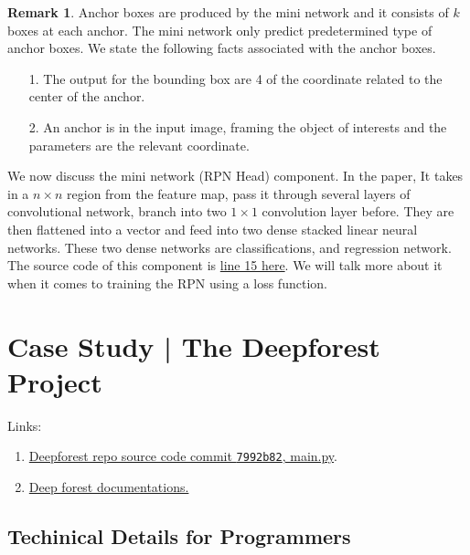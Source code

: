 \documentclass[]{article}
\theoremstyle{definition}
\newtheorem{remark}{Remark}[subsection]
{
    \newtheorem{assumption}{Assumption}
}
\numberwithin{equation}{subsection}
\newcommand{\inlinecode}[1]{\texttt{\footnotesize #1}}
\begin{document}
            \begin{remark}
                Anchor boxes are produced by the mini network and it consists of $k$ boxes at each anchor. 
                The mini network only predict predetermined type of anchor boxes.
                We state the following facts associated with the anchor boxes.  
                \begin{enumerate}
                    \item [1.] The output for the bounding box are 4 of the coordinate related to the center of the anchor. 
                    \item [2.] An anchor is in the input image, framing the object of interests and the parameters are the relevant coordinate. 
                \end{enumerate}
            \end{remark}
            \par
            We now discuss the mini network (RPN Head) component. 
            In the paper, It takes in a $n\times n$ region from the feature map, pass it through several layers of convolutional network, branch into two $1\times 1$ convolution layer before. 
            They are then flattened into a vector and feed into two dense stacked linear neural networks. These two dense networks are classifications, and regression network. 
            The source code of this component is \href{https://github.com/pytorch/vision/blob/5181a854d8b127cf465cd22a67c1b5aaf6ccae05/torchvision/models/detection/rpn.py#L15}{line 15 here}. 
            We will talk more about it when it comes to training the RPN using a loss function. 
            
\section{Case Study | The Deepforest Project}
    Links: 
    \begin{enumerate}
        \item \href{https://github.com/weecology/DeepForest/blob/6b1c199ce65f95dc74c9e79d1e2c686e784910b2/deepforest/main.py}{Deepforest repo source code commit \inlinecode{7992b82}, main.py}. 
        \item \href{https://deepforest.readthedocs.io/en/latest/getting_started.html}{Deep forest documentations. }
    \end{enumerate}
    \subsection{Techinical Details for Programmers}
        
\end{document}
